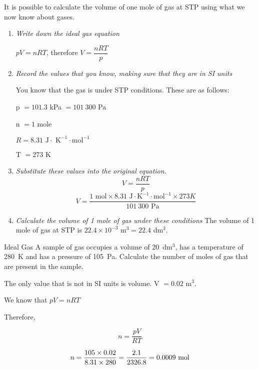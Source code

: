 It is possible to calculate the volume of one mole of gas at STP using what we now know about gases.

\begin{enumerate}
\item{\textit{Write down the ideal gas equation}}
\begin{center}
$pV = nRT$, therefore $V = \dfrac{nRT}{p}$
\end{center}
\item{\textit{Record the values that you know, making sure that they are in SI units}}

You know that the gas is under STP conditions. These are as follows:

p $= 101.3$ kPa $= 101~300$ Pa

n $= 1$ mole

$R = 8.31 \text{ J} \cdot \text{ K}^{-1} \cdot \text{mol}^{-1}$

T $= 273$ K
\item{\textit{Substitute these values into the original equation.}}
\begin{equation*}
V = \frac{nRT}{p}
\end{equation*}
\begin{equation*}
V = \frac{1 \text{ mol} \times 8.31 \text{ J} \cdot \text{K}^{-1} \cdot \text{mol}^{-1} \times 273 K}{101~300 \text{ Pa}}
\end{equation*}
\item{\textit{Calculate the volume of 1 mole of gas under these conditions}
The volume of 1 mole of gas at STP is $22.4 \times 10^{-3}$ m$^{3} = 22.4$ dm$^{3}$.}
\end{enumerate}


\vspace{-.5cm}
\begin{wex}{Ideal Gas}
{A sample of gas occupies a volume of 20~dm$^3$, has a temperature of 280~K and has a pressure of 105~Pa. Calculate the number of moles of gas that are present in the sample.}{

The only value that is not in SI units is volume. V $= 0.02$ m$^{3}$.

We know that $pV = nRT$

Therefore,

\begin{equation*}
n = \dfrac{pV}{RT}
\end{equation*}

\begin{equation*}
n = \frac{105 \times 0.02}{8.31 \times 280}
= \frac{2.1}{2326.8}\\
= 0.0009 \text{ mol}
\end{equation*}
}
\end{wex}

